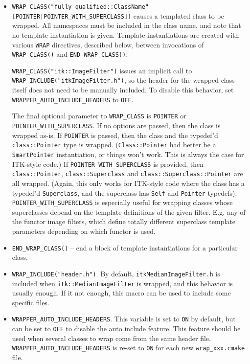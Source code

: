 \documentclass{InsightArticle}
\begin{document}
\begin{itemize}
  \item \verb$WRAP_CLASS("fully_qualified::ClassName" [POINTER|POINTER_WITH_SUPERCLASS])$
causes a templated class to be wrapped. All namespaces must be included in the
class name, and note that no template instantiation is given. Template
instantiations are created with various \verb$WRAP$ directives, described below,
between invocations of \verb$WRAP_CLASS()$ and \verb$END_WRAP_CLASS()$.

\verb$WRAP_CLASS("itk::ImageFilter")$ issues an implicit call to \verb$WRAP_INCLUDE("itkImageFilter.h")$, so the header
for the wrapped class itself does not need to be manually included. To disable
this behavior, set \verb$WRAPPER_AUTO_INCLUDE_HEADERS$ to \verb$OFF$.

The final optional parameter to \verb$WRAP_CLASS$ is \verb$POINTER$ or
\verb$POINTER_WITH_SUPERCLASS$. If no options are passed, then the class is wrapped
as-is. If \verb$POINTER$ is passed, then the class and the typedef'd \verb$class::Pointer$
type is wrapped. (\verb$Class::Pointer$ had better be a \verb$SmartPointer$ instantiation, or
things won't work. This is always the case for ITK-style code.) If
\verb$POINTER_WITH_SUPERCLASS$ is provided, then \verb$class::Pointer$, \verb$class::Superclass$ and
\verb$class::Superclass::Pointer$ are all wrapped. (Again, this only works for
ITK-style code where the class has a typedef'd \verb$Superclass$, and the superclass
has \verb$Self$ and \verb$Pointer$ typedefs). \verb$POINTER_WITH_SUPERCLASS$ is especially
useful for wrapping classes whose superclasses depend on the template definitions of the given
filter. E.g. any of the functor image filters, which define totally different superclass
template parameters depending on which functor is used.

  \item \verb$END_WRAP_CLASS()$ -- end a block of template instantiations for a particular
class.

  \item \verb$WRAP_INCLUDE("header.h")$. By default, \verb$itkMedianImageFilter.h$ is included
when \verb$itk::MedianImageFilter$ is wrapped, and this behavior is usually
enough. If it not enough, this macro can be used to include some specific files.

  \item \verb$WRAPPER_AUTO_INCLUDE_HEADERS$. This variable is set to \verb$ON$ by default, but can
be set to \verb$OFF$ to disable the auto include feature. This feature should be used when several
classes to wrap come from the same header file.
\verb$WRAPPER_AUTO_INCLUDE_HEADERS$ is re-set to \verb$ON$ for each new \verb$wrap_xxx.cmake$ file.


\end{itemize}
\end{document}
